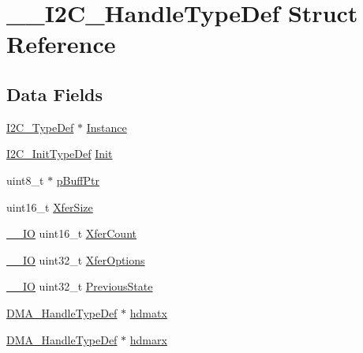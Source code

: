 \hypertarget{struct_____i2_c___handle_type_def}{}\section{\+\_\+\+\_\+\+I2\+C\+\_\+\+Handle\+Type\+Def Struct Reference}
\label{struct_____i2_c___handle_type_def}
\subsection*{Data Fields}
\begin{DoxyCompactItemize}
\item 
\hyperlink{struct_i2_c___type_def}{I2\+C\+\_\+\+Type\+Def} $\ast$ \hyperlink{struct_____i2_c___handle_type_def_a080380e6051dd88c3a88c24aad4b10c0}{Instance}
\item 
\hyperlink{struct_i2_c___init_type_def}{I2\+C\+\_\+\+Init\+Type\+Def} \hyperlink{struct_____i2_c___handle_type_def_a8e665bc833889975a33b10bebeab5db2}{Init}
\item 
uint8\+\_\+t $\ast$ \hyperlink{struct_____i2_c___handle_type_def_af699cc26b19f28b9215d3d4a167f068e}{p\+Buff\+Ptr}
\item 
uint16\+\_\+t \hyperlink{struct_____i2_c___handle_type_def_a1b8a62241b4c22d97af542186cef0c39}{Xfer\+Size}
\item 
\hyperlink{core__sc300_8h_aec43007d9998a0a0e01faede4133d6be}{\+\_\+\+\_\+\+IO} uint16\+\_\+t \hyperlink{struct_____i2_c___handle_type_def_a314305a14bb912531cfc3c5f87291777}{Xfer\+Count}
\item 
\hyperlink{core__sc300_8h_aec43007d9998a0a0e01faede4133d6be}{\+\_\+\+\_\+\+IO} uint32\+\_\+t \hyperlink{struct_____i2_c___handle_type_def_a5d3ace2bbb83f44d4fe3df47fa42bb90}{Xfer\+Options}
\item 
\hyperlink{core__sc300_8h_aec43007d9998a0a0e01faede4133d6be}{\+\_\+\+\_\+\+IO} uint32\+\_\+t \hyperlink{struct_____i2_c___handle_type_def_a028d3e824c01ccc6c9a23bb5802e3313}{Previous\+State}
\item 
\hyperlink{group___d_m_a___exported___types_ga41b754a906b86bce54dc79938970138b}{D\+M\+A\+\_\+\+Handle\+Type\+Def} $\ast$ \hyperlink{struct_____i2_c___handle_type_def_ad8f3153daebc780294797b448decb190}{hdmatx}
\item 
\hyperlink{group___d_m_a___exported___types_ga41b754a906b86bce54dc79938970138b}{D\+M\+A\+\_\+\+Handle\+Type\+Def} $\ast$ \hyperlink{struct_____i2_c___handle_type_def_a52dcaac577eef13388d209f3f5a6a4b9}{hdmarx}

\end{DoxyCompactItemize}
